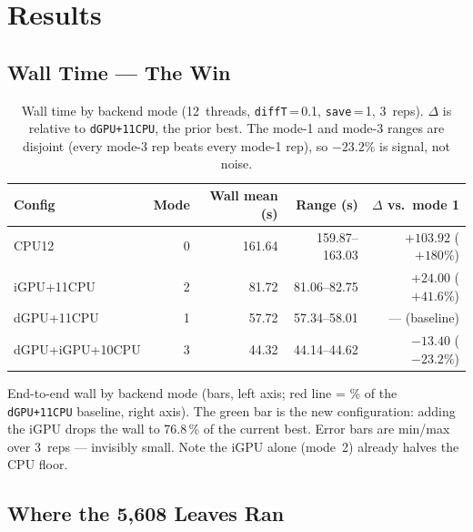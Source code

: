\documentclass[
	english,
	letterpaper, oneside
]{article}
\begin{document}
\section{Results}

\subsection{Wall Time --- The Win}

\begin{table}[H]
    \centering
    \caption{Wall time by backend mode (12~threads, \texttt{diffT}\,=\,0.1,
             \texttt{save}\,=\,1, 3~reps). $\Delta$ is relative to
             \texttt{dGPU+11CPU}, the prior best. The mode-1 and mode-3 ranges are
             disjoint (every mode-3 rep beats every mode-1 rep), so $-23.2\%$
             is signal, not noise.}
    \label{tab:wall}
    \begin{tabular}{lrrrr}
        \hline
        Config & Mode & Wall mean (s) & Range (s) & $\Delta$ vs.\ mode 1 \\
        \hline
        CPU12            & 0 & 161.64 & 159.87--163.03 & $+103.92$ ($+180\%$) \\
        iGPU+11CPU       & 2 & 81.72  & 81.06--82.75   & $+24.00$ ($+41.6\%$) \\
        dGPU+11CPU       & 1 & 57.72  & 57.34--58.01   & --- (baseline) \\
        dGPU+iGPU+10CPU & 3 & 44.32 & 44.14--44.62 & $-13.40$ ($-23.2\%$) \\
        \hline
    \end{tabular}
\end{table}

            {End-to-end wall by backend mode (bars, left axis; red line = \% of the
             \texttt{dGPU+11CPU} baseline, right axis). The green bar is the new
             configuration: adding the iGPU drops the wall to 76.8\,\% of the
             current best. Error bars are min/max over 3~reps --- invisibly small.
             Note the iGPU alone (mode~2) already halves the CPU floor.
             \label{fig:wall}}

\subsection{Where the 5{,}608 Leaves Ran}
\end{document}

